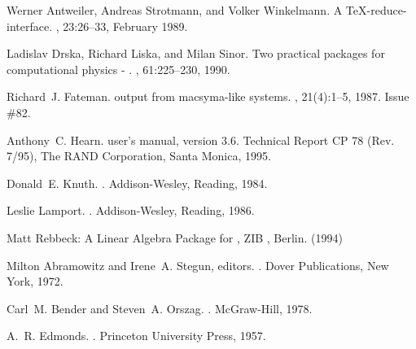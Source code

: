 \begin{thebibliography}{999}


Werner Antweiler, Andreas Strotmann, and Volker Winkelmann.
\newblock A {\TeX-{reduce}-interface}.
, 23:26--33, February 1989.

Ladislav Drska, Richard Liska, and Milan Sinor.
\newblock Two practical packages for computational physics - .
, 61:225--230, 1990.

Richard~J. Fateman.
\newblock \protect{\TeX\ } output from macsyma-like systems.
, 21(4):1--5, 1987.
\newblock Issue \#82.

Anthony~C. Hearn.
\newblock {} user's manual, version 3.6.
\newblock Technical Report CP 78 (Rev. 7/95), The RAND Corporation, Santa
  Monica, 1995.

Donald~E. Knuth.
.
\newblock Addison-Wesley, Reading, 1984.

Leslie Lamport.
.
\newblock Addison-Wesley, Reading, 1986.


 Matt Rebbeck: A Linear Algebra Package for {\REDUCE}, ZIB
, Berlin. (1994)





Milton Abramowitz and Irene~A. Stegun, editors.
.
\newblock Dover Publications, New York, 1972.

Carl~M. Bender and Steven~A. Orszag.
.
\newblock McGraw-Hill, 1978.

A.~R. Edmonds.
.
\newblock Princeton University Press, 1957.


\end{thebibliography}
